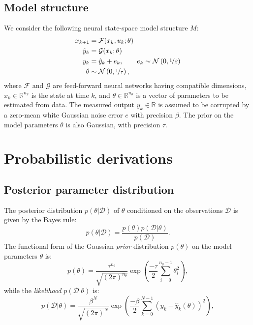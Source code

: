 \documentclass{ifacconf}
\newcommand{\R}{\mathbb{R}}
\newcommand{\nx}{{n_x}}
\newcommand{\nsamp}{N}
\newcommand{\npar}{{n_\theta}}
\newcommand{\F}{\mathcal{F}} %
\newcommand{\G}{\mathcal{G}} %
\newcommand{\N}{\mathcal{N}} %
\newcommand{\mean}[1]{\hat{#1}}
\newcommand{\D}{\mathcal{D}} %
\begin{document}
\subsection{Model structure}
We consider the following neural state-space model structure $M$: 
 \begin{subequations}
  \label{eq:ss_model}
 \begin{align}
  x_{k+1} &= \F(x_k, u_k; \theta) \label{eq:ss_model_a} \\
  \mean{y}_{k} &= \G(x_k; \theta) \label{eq:ss_model_b}\\
  y_{k} &=  \mean{y}_{k} + e_k, \qquad e_k \sim \N\left(0, \nicefrac{1}{\beta}\right)  \\
  \theta &\sim \N\left(0, \nicefrac{1}{\tau}\right),
  \end{align}
\end{subequations}
where $\F$ and $\G$ are feed-forward neural networks having compatible dimensions, $x_k \in \mathbb{R}^{\nx}$ is the state at time $k$, and $\theta \in \mathbb{R}^{n_\theta}$ is a vector of parameters to be estimated from data. The measured output $y_{k} \in \R$ is assumed to be corrupted by a zero-mean white Gaussian noise error $e$ with {precision} $\beta$. The prior on the model parameters $\theta$ is also Gaussian, with precision $\tau$.


\section{Probabilistic derivations}
\subsection{Posterior parameter distribution}
The  posterior distribution $p(\theta |  \D)$ of $\theta$ conditioned on the observations $\D$ is given by the Bayes rule:
\begin{equation}
\label{eq:bayes_rule}
p(\theta |  \D) = \frac{p(\theta) p(\D|\theta)}{p(\D)}.
\end{equation}
The functional form of the Gaussian \emph{prior} distribution $p(\theta)$ on the model parameters $\theta$ is:
\begin{equation}
\label{eq:theta_prior}
p(\theta) = \frac{\tau^\npar}{\sqrt{(2\pi)^{\npar} }} \exp\left(\frac{-\tau}{2} \sum_{i=0}^{\npar-1} \theta_i^2\right),
\end{equation}
while the \emph{likelihood} $p(\mathcal{D}|\theta)$ is:
\begin{equation}
\label{eq:likelihood}
p(\mathcal{D}|\theta) = \frac{\beta^\nsamp}{\sqrt{(2\pi)^{\nsamp} }} \exp\left(\frac{-\beta}{2}\sum_{k=0}^{\nsamp-1}{(y_k - \mean{y}_k(\theta))^2}\right),
\end{equation}
\end{document}
